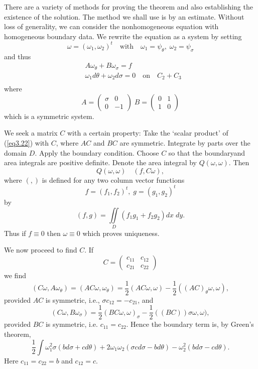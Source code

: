 There are a variety of methods for proving the theorem and also establishing the existence of the solution. The method we shall use is by an estimate. Without loss of generality, we can consider the nonhomogeneous equation with homogeneous boundary data. We rewrite the equation as a system by setting
$$
\omega = (\omega_1 , \omega_2)^t \quad \text{with} \quad \omega_1 = \psi_\theta, \; \omega_2 = \psi_\sigma
$$
and thus 
\begin{equation*}
\begin{split}
&  A \omega_\theta + B \omega_\sigma = f\\
& \omega_1 d\theta + \omega_2 d\sigma = 0 \quad \text{on}\quad C_2 + C_3\\
\end{split}\tag{3.22}\label{eq3.22}
\end{equation*}
where 
\begin{equation*}
A = \begin{pmatrix}
\sigma & 0\\
0 & -1
\end{pmatrix} \; B = \begin{pmatrix}
0 & 1\\
1 & 0
\end{pmatrix}
\tag{3.23}\label{eq3.23}
\end{equation*}
which is a symmetric system.

We seek a matrix $C$ with a certain property: Take the `scalar product'  of (\ref{eq3.22}) with $C$, where $AC$ and $BC$ are symmetric. Integrate by parts over the domain $D$. Apply the boundary condition. Choose $C$ so that the boundary\pageoriginale and area integrals are positive definite. Denote the area integral by $Q(\omega, \omega)$. Then
$$
Q(\omega, \omega) \quad (f, C\omega), 
$$
where $(,)$ is defined for any two column vector functions
$$
f = (f_1 , f_2)^t, \; g = (g_1, g_2)^t
$$
by
$$
(f,g) = \iint\limits_D (f_1 g_1 + f_2 g_2) dx \; dy.
$$
Thus if $f \equiv 0$ then $\omega \equiv 0$ which proves uniqueness.

We now proceed to find $C$. If
$$
C = 
\begin{pmatrix}
c_{11} & c_{12}\\
c_{21} & c_{22}
\end{pmatrix}
$$
we find 
$$
(C\omega, A \omega_\theta) = (A C \omega, \omega_\theta) = \frac{1}{2} (AC\omega, \omega) - \frac{1}{2} ((AC)_\theta \omega, \omega), 
$$
provided $AC$ is symmetric, i.e., $\sigma c_{12} = - c_{21}$, and 
$$
(C\omega, B\omega_\sigma) = \frac{1}{2} (BC\omega, \omega)_\sigma - \frac{1}{2} ((BC))\sigma \omega, \omega),
$$
provided $BC$ is symmetric, i.e. $c_{11} = c_{22}$. Hence the boundary term is, by Green's theorem,
$$
\frac{1}{2} \int \omega^2_1 \sigma (bd \sigma + cd \theta) + 2 \omega_1 \omega_2 (\sigma cd \sigma - b d \theta) - \omega^2_2 (bd \sigma - cd\theta). 
$$
Here $c_{11} = c_{22} = b$ and $c_{12} = c$. 

